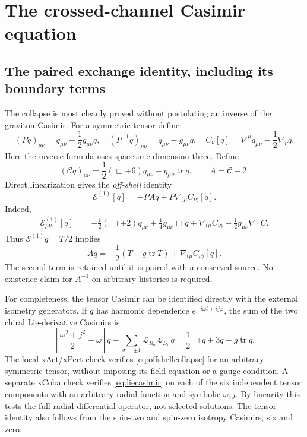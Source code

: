 \documentclass[11pt,a4paper]{article}
\numberwithin{equation}{section}
\theoremstyle{remark}\newtheorem{remark}[theorem]{Remark}
\newcommand{\tr}{\operatorname{tr}}
\newcommand{\calC}{\mathscr C}
\begin{document}
\section{The crossed-channel Casimir equation}
\label{sec:cross}

\subsection{The paired exchange identity, including its boundary terms}
\label{sec:pairedcollapse}

The collapse is most cleanly proved without postulating an inverse of the graviton Casimir. For a symmetric tensor define
\begin{equation}
 (Pq)_{\mu\nu}=q_{\mu\nu}-\frac12g_{\mu\nu}q,
 \quad (P^{-1}q)_{\mu\nu}=q_{\mu\nu}-g_{\mu\nu}q,
 \quad C_\nu[q]=\nabla^\mu q_{\mu\nu}-\frac12\nabla_\nu q.
\end{equation}
Here the inverse formula uses spacetime dimension three. Define
\begin{equation}
 (\calC q)_{\mu\nu}=\frac12(\Box+6)q_{\mu\nu}-g_{\mu\nu}\tr q,
 \qquad A=\calC-2.
 \label{eq:tensorcasimir}
\end{equation}
Direct linearization gives the \emph{off-shell} identity
\begin{equation}
 \boxed{\mathcal E^{(1)}[q]=-P A q+P\nabla_{(\mu}C_{\nu)}[q].}
 \label{eq:offshellcollapse}
\end{equation}
Indeed,
\begin{align}
 \mathcal E^{(1)}_{\mu\nu}[q]
 ={}&-\frac12(\Box+2)q_{\mu\nu}+\frac14g_{\mu\nu}\Box q
 +\nabla_{(\mu}C_{\nu)}-\frac12g_{\mu\nu}\nabla\cdot C.
\end{align}
Thus $\mathcal E^{(1)}q=T/2$ implies
\begin{equation}
 \boxed{Aq=-\frac12(T-g\tr T)+\nabla_{(\mu}C_{\nu)}[q].}
 \label{eq:collapsewithgauge}
\end{equation}
The second term is retained until it is paired with a conserved source. No existence claim for $A^{-1}$ on arbitrary histories is required.

For completeness, the tensor Casimir can be identified directly with the external isometry generators. If $q$ has harmonic dependence $e^{-i\omega t+ij\varphi}$, the sum of the two chiral Lie-derivative Casimirs is
\begin{equation}
 \left[\frac{\omega^2+j^2}{2}-\omega\right]q
 -\sum_{\sigma=\pm1}\mathcal L_{R_\sigma}\mathcal L_{D_\sigma}q
 =\frac12\Box q+3q-g\tr q.
 \label{eq:liecasimir}
\end{equation}
The local xAct/xPert check verifies \eqref{eq:offshellcollapse} for an arbitrary symmetric tensor, without imposing its field equation or a gauge condition. A separate xCoba check verifies \eqref{eq:liecasimir} on each of the six independent tensor components with an arbitrary radial function and symbolic $\omega,j$. By linearity this tests the full radial differential operator, not selected solutions. The tensor identity also follows from the spin-two and spin-zero isotropy Casimirs, six and zero.
\end{document}
